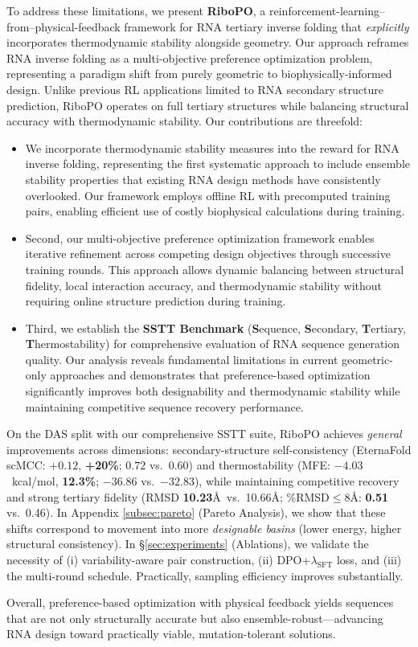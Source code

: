 To address these limitations, we present \textbf{RiboPO}, a reinforcement-learning–from–physical-feedback framework for RNA tertiary inverse folding that \emph{explicitly} incorporates thermodynamic stability alongside geometry. Our approach reframes RNA inverse folding as a multi-objective preference optimization problem, representing a paradigm shift from purely geometric to biophysically-informed design. Unlike previous RL applications limited to RNA secondary structure prediction, RiboPO operates on full tertiary structures while balancing structural accuracy with thermodynamic stability.
Our contributions are threefold:
\begin{itemize}[leftmargin=*]
\item  We incorporate thermodynamic stability measures into the reward for RNA inverse folding, representing the first systematic approach to include ensemble stability properties that existing RNA design methods have consistently overlooked.
Our framework employs offline RL with precomputed training pairs, enabling efficient use of costly biophysical calculations during training.
\item Second, our multi-objective preference optimization framework enables iterative refinement across competing design objectives through successive training rounds. This approach allows dynamic balancing between structural fidelity, local interaction accuracy, and thermodynamic stability without requiring online structure prediction during training.
\item Third, we establish the \textbf{SSTT Benchmark} (\textbf{S}equence, \textbf{S}econdary, \textbf{T}ertiary, \textbf{T}hermostability) for comprehensive evaluation of RNA sequence generation quality. Our analysis reveals fundamental limitations in current geometric-only approaches and demonstrates that preference-based optimization significantly improves both designability and thermodynamic stability while maintaining competitive sequence recovery performance.
\end{itemize}

On the DAS split \citep{das2010farfar, joshi2025grnade} with our comprehensive SSTT suite, RiboPO achieves \emph{general} improvements across dimensions: secondary-structure self-consistency (EternaFold scMCC: $+0.12$, \textbf{+20\%}; $0.72$ vs.\ $0.60$) and thermostability (MFE: \textbf{$-4.03$}~kcal/mol, \textbf{12.3\%}; $-36.86$ vs.\ $-32.83$), while maintaining competitive recovery and strong tertiary fidelity (RMSD \textbf{10.23}\AA\ vs.\ 10.66\AA; \%RMSD$\le 8$\AA: \textbf{0.51} vs.\ 0.46). 
{ In Appendix \ref{subsec:pareto} (Pareto Analysis), we show that these shifts correspond to movement into more \emph{designable basins} (lower energy, higher structural consistency).} 
In \S\ref{sec:experiments} (Ablations), we validate the necessity of (i) variability-aware pair construction, (ii) DPO+$\lambda_{\text{SFT}}$ loss, and (iii) the multi-round schedule. Practically, sampling efficiency improves substantially.

Overall, preference-based optimization with physical feedback yields sequences that are not only structurally accurate but also ensemble-robust—advancing RNA design toward practically viable, mutation-tolerant solutions.